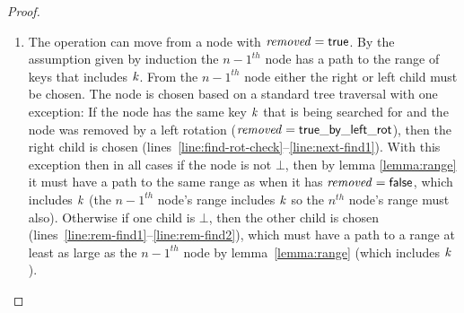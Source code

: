 \begin{proof}
\begin{itemize}
\begin{enumerate}
\item The operation can move from a node with $\ms{removed}=\lit{true}$.
By the assumption given by induction the $n-1^{th}$ node has a path to the range of keys that includes $\ms{k}$.
From the $n-1^{th}$ node either the right or left child must be chosen.
The node is chosen based on a standard tree traversal with one exception:
If the node has the same key $\ms{k}$ that is being searched for and the node was removed by a left rotation
($\ms{removed}=\lit{true\_by\_left\_rot}$), then the right child is chosen (lines~\ref{line:find-rot-check}--\ref{line:next-find1}).
With this exception then in all cases if the node is not $\bot$, then by lemma \ref{lemma:range} it must have a path to the same range as when it has $\ms{removed}=\lit{false}$, which includes $\ms{k}$
(the $n-1^{th}$ node's range includes $\ms{k}$ so the $n^{th}$ node's range must also).
Otherwise if one child is $\bot$, then the other child is chosen (lines~\ref{line:rem-find1}--\ref{line:rem-find2}), which must have a path to a range at
least as large as the $n-1^{th}$ node by lemma~\ref{lemma:range} (which includes $\ms{k}$).
\end{enumerate}
\end{itemize}
\end{proof}

